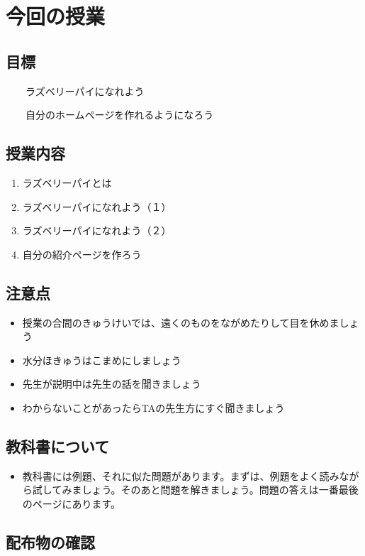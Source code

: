 \documentclass[a4paper,12pt]{jarticle}
\begin{document}
\section{今回の授業}
\subsection{目標}
\ \ \ \ ラズベリーパイになれよう

\ \ \ \ 自分のホームページを作れるようになろう

\subsection{授業内容}
\begin{enumerate}
  \item ラズベリーパイとは
  \item ラズベリーパイになれよう（１）
  \item ラズベリーパイになれよう（２）
  \item 自分の紹介ページを作ろう
\end{enumerate}
\subsection{注意点}
\begin{itemize}
  \item
        授業の合間のきゅうけいでは、遠くのものをながめたりして目を休めましょう
  \item 水分ほきゅうはこまめにしましょう
  \item
        先生が説明中は先生の話を聞きましょう
  \item
        わからないことがあったらTAの先生方にすぐ聞きましょう
\end{itemize}
\subsection{教科書について}
\begin{itemize}
  \item
        教科書には例題、それに似た問題があります。まずは、例題をよく読みながら試してみましょう。そのあと問題を解きましょう。問題の答えは一番最後のページにあります。
\end{itemize}
\clearpage\subsection{配布物の確認}
\end{document}
